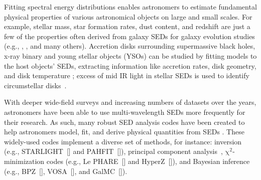 \documentclass[preprint,authoryear,5p]{elsarticle}
\begin{document}
Fitting spectral energy distributions enables astron\-omers to estimate fundamental
physical properties of various astronomical objects on large and small scales. 
For example, stellar mass, star formation rates, dust content, and redshift
are just a few of the properties often derived from galaxy SEDs for galaxy
evolution studies (e.g.\citet{1998AJ....115.1329S},
\citet{2001ApJS..137..139S}, \citet{2007ApJS..169..328R}, and many others). 
Accretion disks surrounding supermassive black holes, x-ray binary and young stellar objects (YSOs) can be studied by
fitting models to the host objects' SEDs, extracting information like 
accretion rates, disk geometry, and disk temperature \citep{1990A&A...235..162V,1997ApJ...490..368C,2006ApJS..167..256R}; 
excess of mid IR light in stellar SEDs is used to identify circumstellar 
disks~\citep{2000prpl.conf..639L,2005ApJ...623..493C}.




With deeper wide-field surveys and increasing numbers of datasets over the years,
astronomers have been able to use multi-wavelength SEDs more frequently for
their research. As such, many robust SED analysis codes have been created to
help astronomers mod\-el, fit, and derive physical quantities from SEDs
\citep{2011Ap&SS.331....1W,2013ARA&A..51..393C}. These widely-used codes
implement a diverse set of methods, for instance: inversion (e.g., 
STARLIGHT~[\citealp{2004MNRAS.355..273C}] and
PAHFIT~[\citealp{2007ApJ...656..770S}]),
principal component analysis~\citep[e.g.,][]{2009MNRAS.394.1496B},
$\mathrm{\chi}^{2}$-minimization codes 
(e.g., Le PHARE~[\citealp{1999MNRAS.310..540A,2006A&A...457..841I}] and 
HyperZ~[\citealp{2000A&A...363..476B}]), and Bayesian inference 
(e.g., BPZ~[\citealp{2000ApJ...536..571B}], 
VOSA~[\citealp{2008A&A...492..277B}], and 
GalMC~[\citealp{2011ApJ...737...47A}]).
\end{document}
